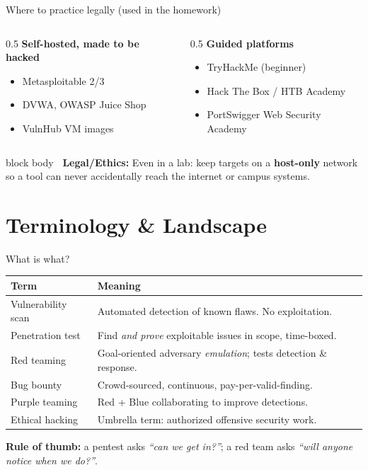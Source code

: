 \documentclass[aspectratio=169,11pt]{beamer}
\newcommand{\legalbox}[1]{%
  \begin{beamercolorbox}[wd=\textwidth,sep=6pt,rounded=true]{block body}%
  \color{warnRed}\textbf{\faExclamationTriangle\ Legal/Ethics:} #1%
  \end{beamercolorbox}}
\begin{document}
\begin{frame}{Where to practice legally (used in the homework)}
  \begin{columns}[T]
    \begin{column}{0.5\textwidth}
      \textbf{Self-hosted, made to be hacked}
      \begin{itemize}\footnotesize
        \item Metasploitable 2/3
        \item DVWA, OWASP Juice Shop
        \item VulnHub VM images
      \end{itemize}
    \end{column}
    \begin{column}{0.5\textwidth}
      \textbf{Guided platforms}
      \begin{itemize}\footnotesize
        \item TryHackMe (beginner)
        \item Hack The Box / HTB Academy
        \item PortSwigger Web Security Academy
      \end{itemize}
    \end{column}
  \end{columns}
  \legalbox{Even in a lab: keep targets on a \textbf{host-only} network so a
  tool can never accidentally reach the internet or campus systems.}
\end{frame}

\section{Terminology \& Landscape}
\begin{frame}{What is what?}
  \begin{table}\footnotesize
  \begin{tabular}{@{}p{3.0cm}p{8.4cm}@{}}
  \toprule
  \textbf{Term} & \textbf{Meaning} \\ \midrule
  Vulnerability scan & Automated detection of known flaws. No exploitation. \\
  Penetration test   & Find \emph{and prove} exploitable issues in scope, time-boxed. \\
  Red teaming        & Goal-oriented adversary \emph{emulation}; tests detection \& response. \\
  Bug bounty         & Crowd-sourced, continuous, pay-per-valid-finding. \\
  Purple teaming     & Red + Blue collaborating to improve detections. \\
  Ethical hacking    & Umbrella term: authorized offensive security work. \\
  \bottomrule
  \end{tabular}\end{table}
  \footnotesize\textbf{Rule of thumb:} a pentest asks \emph{``can we get in?''};
  a red team asks \emph{``will anyone notice when we do?''}.
\end{frame}
\end{document}
